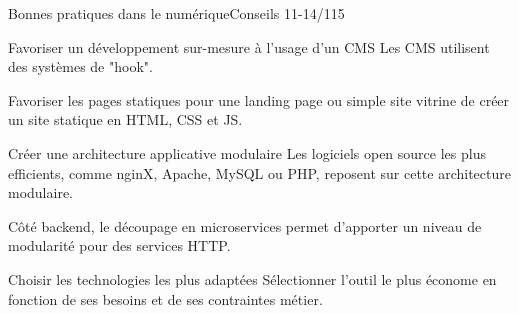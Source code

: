 
\begin{frame}{Bonnes pratiques dans le numérique}{Conseils 11-14/115}

\begin{block}{Favoriser un développement sur-mesure à l'usage d'un CMS}
Les CMS utilisent des systèmes de "hook".
\end{block}

\begin{block}{Favoriser les pages statiques}
pour une landing page ou simple site vitrine de créer un site statique en HTML, CSS et JS.
\end{block}

\begin{block}{Créer une architecture applicative modulaire}
Les logiciels open source les plus efficients, comme nginX, Apache, MySQL ou PHP, reposent sur cette architecture modulaire.

Côté backend, le découpage en microservices permet d'apporter un niveau de modularité pour des services HTTP. 
\end{block}


\begin{block}{Choisir les technologies les plus adaptées}
 Sélectionner l’outil le plus économe en fonction de ses besoins et de ses contraintes métier.
\end{block}

\end{frame}


